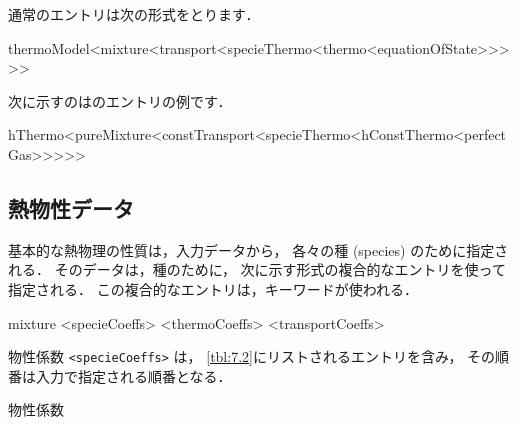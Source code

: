 通常のエントリは次の形式をとります．
\begin{OFverbatim}[file]
thermoModel<mixture<transport<specieThermo<thermo<equationOfState>>>>>
\end{OFverbatim}
次に示すのはのエントリの例です．
\begin{OFverbatim}[file]
hThermo<pureMixture<constTransport<specieThermo<hConstThermo<perfectGas>>>>>
\end{OFverbatim}


\subsection{熱物性データ}
\label{ssec:7.1.1}
基本的な熱物理の性質は，入力データから，
各々の種 (species) のために指定される．
そのデータは，種のために，
次に示す形式の複合的なエントリを使って指定される．
この複合的なエントリは，キーワードが使われる．
\begin{OFverbatim}[file]
mixture <specieCoeffs> <thermoCoeffs> <transportCoeffs>
\end{OFverbatim}
物性係数 \verb|<specieCoeffs>| は，
\autoref{tbl:7.2}にリストされるエントリを含み，
その順番は入力で指定される順番となる．


\begin{table}[ht]
 
 \caption{物性係数}
 \label{tbl:7.2}
\end{table}


